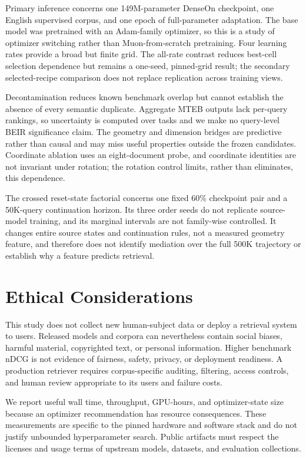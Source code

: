 \documentclass[11pt]{article}
\begin{document}
Primary inference concerns one 149M-parameter DenseOn checkpoint, one English supervised corpus,
and one epoch of full-parameter adaptation. The base model was pretrained with an Adam-family
optimizer, so this is a study of optimizer switching rather than Muon-from-scratch pretraining.
Four learning rates provide a broad but finite grid. The all-rate contrast reduces best-cell
selection dependence but remains a one-seed, pinned-grid result; the secondary selected-recipe
comparison does not replace replication across training views.

Decontamination reduces known benchmark overlap but cannot establish the absence of every semantic
duplicate. Aggregate MTEB outputs lack per-query rankings, so uncertainty is computed over tasks and
we make no query-level BEIR significance claim. The geometry and dimension bridges are predictive
rather than causal and may miss useful properties outside the frozen candidates. Coordinate
ablation uses an eight-document probe, and coordinate identities are not invariant under rotation;
the rotation control limits, rather than eliminates, this dependence.

The crossed reset-state factorial concerns one fixed 60\% checkpoint pair and a 50K-query
continuation horizon. Its three order seeds do not replicate source-model training, and its marginal
intervals are not family-wise controlled. It changes entire source states and continuation rules,
not a measured geometry feature, and therefore does not identify mediation over the full 500K
trajectory or establish why a feature predicts retrieval.

\section{Ethical Considerations}

This study does not collect new human-subject data or deploy a retrieval system to users. Released
models and corpora can nevertheless contain social biases, harmful material, copyrighted text, or
personal information. Higher benchmark nDCG is not evidence of fairness, safety, privacy, or
deployment readiness. A production retriever requires corpus-specific auditing, filtering, access
controls, and human review appropriate to its users and failure costs.

We report useful wall time, throughput, GPU-hours, and optimizer-state size because an optimizer
recommendation has resource consequences. These measurements are specific to the pinned hardware
and software stack and do not justify unbounded hyperparameter search. Public artifacts must respect
the licenses and usage terms of upstream models, datasets, and evaluation collections.
\end{document}
